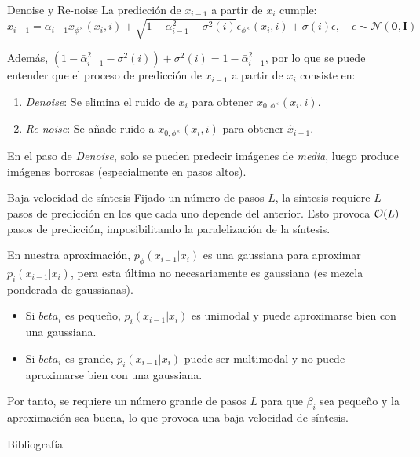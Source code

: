 \documentclass{beamer}
\begin{document}
\begin{frame}{Denoise y Re-noise}
    La predicción de $x_{i-1}$ a partir de $x_i$ cumple:
    \begin{equation*}
        \hat{x}_{i-1} = \bar{\alpha}_{i-1} x_{\phi^\times}(x_i, i) + \sqrt{1-\bar{\alpha}_{i-1}^2-\sigma^2(i)} \epsilon_{\phi^\times}(x_i, i) + \sigma(i) \epsilon, \quad \epsilon\sim\mathcal{N}(\mathbf{0}, \mathbf{I})
    \end{equation*}
    \pause

    Además, $(1-\bar{\alpha}_{i-1}^2-\sigma^2(i))+\sigma^2(i) = 1-\bar{\alpha}_{i-1}^2$, por lo que se puede entender que el proceso de predicción de $x_{i-1}$ a partir de $x_i$ consiste en:
    \begin{enumerate}
        \item \emph{Denoise}: Se elimina el ruido de $x_i$ para obtener $x_{0,\phi^\times}(x_i, i)$.
        \item \emph{Re-noise}: Se añade ruido a $x_{0,\phi^\times}(x_i, i)$ para obtener $\hat{x}_{i-1}$.
    \end{enumerate}
    \pause
    \begin{center}
        En el paso de \emph{Denoise}, solo se pueden predecir imágenes de \emph{media}, luego produce imágenes {\color{red}borrosas} (especialmente en pasos altos).
    \end{center}
\end{frame}

\begin{frame}{Baja velocidad de síntesis}
    Fijado un número de pasos $L$, la síntesis requiere $L$ pasos de predicción en los que cada uno depende del anterior. Esto provoca $\mathcal{O}(L)$ pasos de predicción, imposibilitando la paralelización de la síntesis.\vspace{0.5cm}

    \pause
    En nuestra aproximación, $p_{\phi}(x_{i-1}|x_i)$ es una gaussiana para aproximar $p_i(x_{i-1}|x_i)$, pera esta última no necesariamente es gaussiana (es mezcla ponderada de gaussianas).
    \begin{itemize}
        \item Si $beta_i$ es pequeño, $p_i(x_{i-1}|x_i)$ es unimodal y puede aproximarse bien con una gaussiana.
        \item Si $beta_i$ es grande, $p_i(x_{i-1}|x_i)$ puede ser multimodal y no puede aproximarse bien con una gaussiana.
    \end{itemize}
    
    Por tanto, se requiere un número grande de pasos $L$ para que $\beta_i$ sea pequeño y la aproximación sea buena, lo que provoca una \hspace{2cm} {\color{red}baja velocidad de síntesis}.    
\end{frame}




\begin{frame}[allowframebreaks]{Bibliografía}
    \nocite{lai2026principlesdiffusionmodels}
    \printbibliography
\end{frame}
\end{document}

